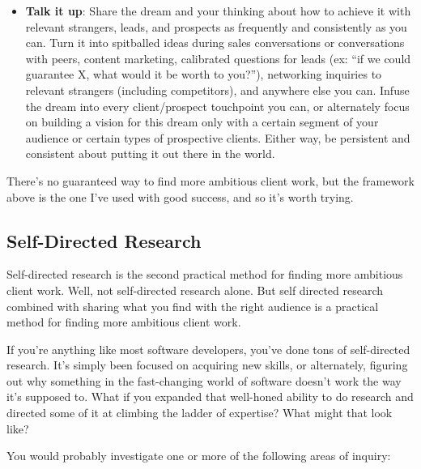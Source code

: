 \begin{itemize}
\item \textbf{Talk it up}: Share the dream and your thinking about how to achieve it with relevant strangers, leads, and prospects as frequently and consistently as you can. Turn it into spitballed ideas during sales conversations or conversations with peers, content marketing, calibrated questions for leads (ex: “if we could guarantee X, what would it be worth to you?”), networking inquiries to relevant strangers (including competitors), and anywhere else you can. Infuse the dream into every client/prospect touchpoint you can, or alternately focus on building a vision for this dream only with a certain segment of your audience or certain types of prospective clients. Either way, be persistent and consistent about putting it out there in the world.
\end{itemize}

There's no guaranteed way to find more ambitious client work, but the framework above is the one I've used with good success, and so it's worth trying.

\subsection{Self-Directed Research}

Self-directed research is the second practical method for finding more ambitious client work. Well, not self-directed research alone. But self directed research combined with sharing what you find with the right audience is a practical method for finding more ambitious client work.

If you're anything like most software developers, you've done tons of self-directed research. It's simply been focused on acquiring new skills, or alternately, figuring out why something in the fast-changing world of software doesn't work the way it's supposed to. What if you expanded that well-honed ability to do research and directed some of it at climbing the ladder of expertise? What might that look like?

You would probably investigate one or more of the following areas of inquiry:

